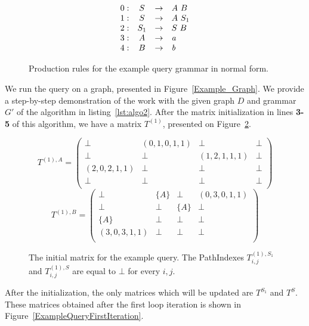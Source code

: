 \begin{figure}[h]
	\[
	\begin{array}{rccl}
	0: & S & \rightarrow & A \ B \\
	1: & S & \rightarrow & A \ S_1 \\
	2: & S_1 & \rightarrow & S \ B \\
	3: & A & \rightarrow & \text{\emph{a}} \\ 
	4: & B & \rightarrow & \text{\emph{b}} \\ 
	\end{array}
	\]
	\caption{Production rules for the example query grammar in normal form.}
	\label{ProductionRulesExampleQueryCNF}
\end{figure}

We run the query on a graph, presented in Figure~\ref{Example_Graph}. We provide a step-by-step demonstration of the work with the given graph $D$ and grammar $G'$ of the algorithm in listing~\ref{lst:algo2}. After the matrix initialization in lines \textbf{3-5} of this algorithm, we have a matrix $T^{(1)}$, presented on Figure~\ref{ExampleQueryInitMatrix}.

\begin{figure}[h]
	\[
	T^{(1),A} = \begin{pmatrix}
	\bot & (0,1,0,1,1)       & \bot & \bot       \\
	\bot & \bot & (1,2,1,1,1)       & \bot \\
	(2,0,2,1,1)       & \bot & \bot & \bot \\
	\bot       & \bot & \bot & \bot \\
	\end{pmatrix}
	\]
	\[
	T^{(1),B} = \begin{pmatrix}
	\bot & \{A\}       & \bot & (0,3,0,1,1)       \\
	\bot & \bot & \{A\}       & \bot \\
	\{A\}       & \bot & \bot & \bot \\
	(3,0,3,1,1)      & \bot & \bot & \bot \\
	\end{pmatrix}
	\]
	\caption{The initial matrix for the example query. The PathIndexes $T^{(1),S_1}_{i,j}$ and $T^{(1),S}_{i,j}$ are equal to $\bot$ for every $i,j$.}
	\label{ExampleQueryInitMatrix}
\end{figure}

After the initialization, the only matrices which will be updated are $T^{S_1}$ and $T^{S}$. These matrices obtained after the first loop iteration is shown in Figure~\ref{ExampleQueryFirstIteration}.

